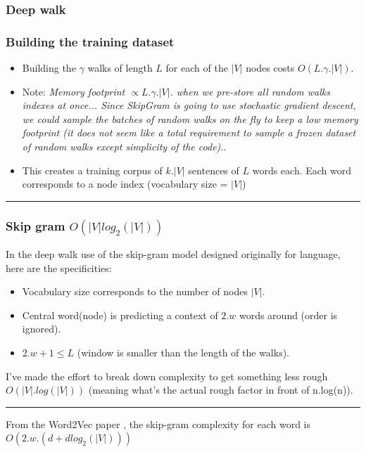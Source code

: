 \documentclass[a4paper]{article}
\begin{document}
\break

\subsubsection*{Deep walk}

\subsubsection*{Building the training dataset}
\begin{itemize}
    \item Building the $\gamma$ walks of length $L$ for each of the $|V|$ nodes costs \textbf{$O(L.\gamma.|V|)$}.
    \item Note: \textit{Memory footprint  $\propto L.\gamma.|V|$. when we pre-store all random walks indexes at once...
    Since SkipGram is going to use stochastic gradient descent,
    we could sample the batches of random walks on the fly to keep a low memory footprint (it does not seem like a total requirement
    to sample a frozen dataset of random walks except simplicity of the code).}.
    \item This creates a training corpus of $k.|V|$ sentences of $L$ words each. Each word corresponds to a node index (vocabulary size = $|V|$) \cite{Perozzi_2014}
\end{itemize}


\hrule
\subsubsection*{Skip gram $O(|V|log_{2}(|V|))$}

In the deep walk use of the skip-gram model designed originally for language, here are the specificities:
\begin{itemize}
    \item Vocabulary size corresponds to the number of nodes $|V|$.
    \item Central word(node) is predicting a context of $2.w$ words around (order is ignored). 
    \item $2.w+1\leq L$ (window is smaller than the length of the walks).
\end{itemize}

I've made the effort to break down complexity to get something less rough $O(|V|.log(|V|))$ (meaning what's the actual rough factor in front of n.log(n)). \\

\hrule


From the Word2Vec paper \cite{mikolov2013efficient}, the skip-gram complexity for each word is $O(2.w.(d+ d log_{2}(|V|)))$
\end{document}
